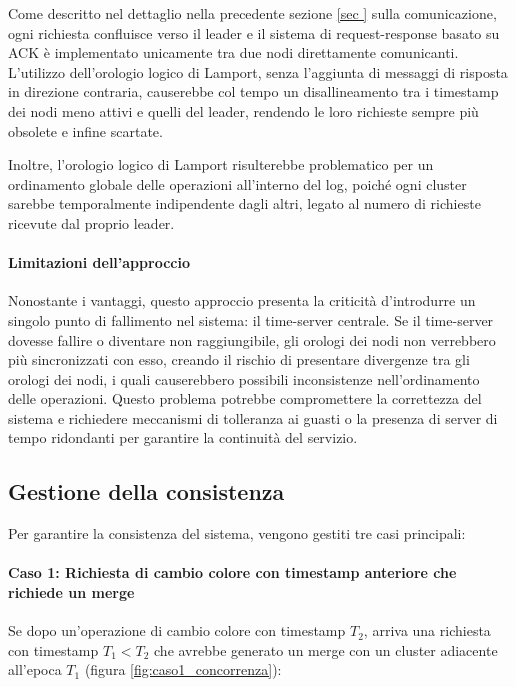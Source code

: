 \documentclass[12pt, a4paper]{report}
\begin{document}
Come descritto nel dettaglio nella precedente sezione \ref{sec
} sulla comunicazione, ogni richiesta confluisce verso il leader e il sistema di request-response basato su ACK \`e implementato unicamente tra due nodi direttamente comunicanti. L'utilizzo dell'orologio logico di Lamport, senza l'aggiunta di messaggi di risposta in direzione contraria, causerebbe col tempo un disallineamento tra i timestamp dei nodi meno attivi e quelli del leader, rendendo le loro richieste sempre pi\`u obsolete e infine scartate.

Inoltre, l'orologio logico di Lamport risulterebbe problematico per un ordinamento globale delle operazioni all'interno del log, poiché ogni cluster sarebbe temporalmente indipendente dagli altri, legato al numero di richieste ricevute dal proprio leader.

\paragraph{Limitazioni dell'approccio}

Nonostante i vantaggi, questo approccio presenta la criticit\`a d'introdurre un singolo punto di fallimento nel sistema: il time-server centrale. Se il time-server dovesse fallire o diventare non raggiungibile, gli orologi dei nodi non verrebbero pi\`u sincronizzati con esso, creando il rischio di presentare divergenze tra gli orologi dei nodi, i quali causerebbero possibili inconsistenze nell'ordinamento delle operazioni. Questo problema potrebbe compromettere la correttezza del sistema e richiedere meccanismi di tolleranza ai guasti o la presenza di server di tempo ridondanti per garantire la continuit\`a del servizio.

\newpage
\subsection{Gestione della consistenza}\label{sec:gestione_consistenza}

Per garantire la consistenza del sistema, vengono gestiti tre casi principali:

\paragraph{Caso 1: Richiesta di cambio colore con timestamp anteriore che richiede un merge}

Se dopo un'operazione di cambio colore con timestamp $T_2$, arriva una richiesta con timestamp $T_1 < T_2$ che avrebbe generato un merge con un cluster adiacente all'epoca $T_1$ (figura \ref{fig:caso1_concorrenza}):
\end{document}
